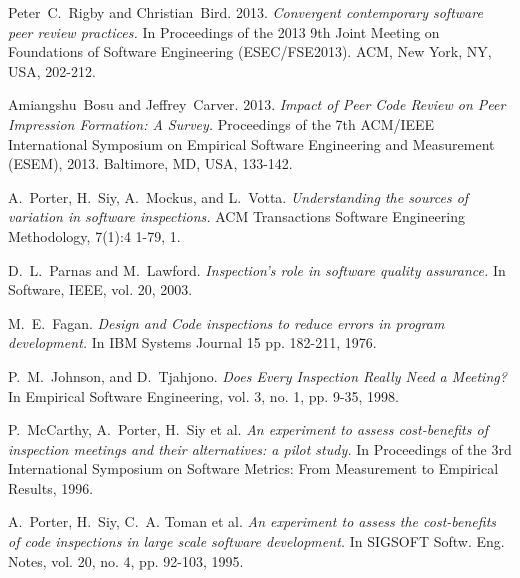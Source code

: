 \documentclass[10pt, conference]{IEEEtran}
\begin{document}
%
%
%
\begin{thebibliography}{1}


Peter~C.~Rigby and Christian~Bird. 2013. \emph{Convergent
contemporary software peer review practices.} In
Proceedings of the 2013 9th Joint Meeting on
Foundations of Software Engineering
(ESEC/FSE2013). ACM, New York, NY, USA, 202-212.

Amiangshu~Bosu and Jeffrey~Carver. 2013. \emph{Impact of
Peer Code Review on Peer Impression Formation: A
Survey.} Proceedings of the 7th ACM/IEEE
International Symposium on Empirical Software
Engineering and Measurement (ESEM), 2013.
Baltimore, MD, USA, 133-142.

A.~Porter, H.~Siy, A.~Mockus, and L.~Votta.
\emph{Understanding the sources of variation in software
inspections.} ACM Transactions Software Engineering
Methodology, 7(1):4 1-79, 1.


D.~L.~Parnas and M.~Lawford. \emph{Inspection’s role in
software quality assurance.} In Software, IEEE, vol.
20, 2003.

M.~E.~Fagan. \emph{Design and Code inspections to reduce
errors in program development.} In IBM Systems
Journal 15 pp. 182-211, 1976.

P.~M.~Johnson, and D.~Tjahjono. \emph{Does Every
Inspection Really Need a Meeting?} In Empirical
Software Engineering, vol. 3, no. 1, pp. 9-35, 1998.

P.~McCarthy, A.~Porter, H.~Siy et al. \emph{An experiment
to assess cost-benefits of inspection meetings and
their alternatives: a pilot study.} In Proceedings of the
3rd International Symposium on Software Metrics:
From Measurement to Empirical Results, 1996.

A.~Porter, H.~Siy, C.~A. Toman et al. \emph{An experiment
to assess the cost-benefits of code inspections in large
scale software development.} In SIGSOFT Softw. Eng.
Notes, vol. 20, no. 4, pp. 92-103, 1995.


\end{thebibliography}
\end{document}
